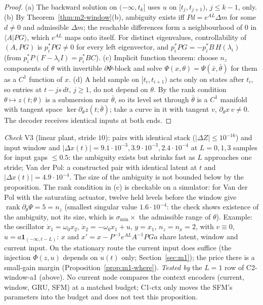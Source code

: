 \begin{proof}
(a) The backward solution on $(-\infty,t_k]$ uses $u$ on $[t_j,t_{j+1})$, $j\le k-1$, only.
(b) By Theorem~\ref{thm:m2-window}(b), ambiguity exists iff $P d=e^{AL}\Delta m$ for some $d\ne0$ and admissible
$\Delta m$; the reachable differences form a neighbourhood of $0$ in $\langle A|PG\rangle$, which $e^{AL}$ maps onto
itself. For distinct eigenvalues, controllability of $(A,PG)$ is $p_i^*PG\ne0$ for every left eigenvector,
and $p_i^*PG=-p_i^*B\,H(\lambda_i)$ (from $p_i^*P(F-\lambda_iI)=p_i^*BC$).
(c) Implicit function theorem: choose $n_z$ components of $\theta$ with invertible $\partial\Psi$-block and solve
$\Psi(x,\theta)=\Psi(\bar x,\bar\theta)$ for them as a $C^1$ function of $x$.
(d) A held sample on $[t_i,t_{i+1})$ acts only on states after $t_i$, so entries at $t-js\,dt$, $j\ge1$, do not depend on
$\theta$. By the rank condition $\theta\mapsto z(t;\theta)$ is a submersion near $\bar\theta$, so its level set through
$\bar\theta$ is a $C^1$ manifold with tangent space $\ker\partial_\theta z(t;\bar\theta)$; take a curve in it with tangent $v$,
$\partial_\theta x\,v\ne0$. The decoder receives identical inputs at both ends.
\end{proof}
\noindent\emph{Check} V3 (linear plant, stride $10$): pairs with identical stack ($|\Delta Z|\le10^{-16}$) and input window and
$|\Delta x(t)|=9.1\cdot10^{-3},3.9\cdot10^{-3},2.4\cdot10^{-4}$ at $L=0,1,3$ samples for input gaps $\le0.5$: the ambiguity
exists but shrinks fast as $L$ approaches one stride; Van der Pol: a constructed pair with identical latent at $t$ and
$|\Delta x(t)|=4.9\cdot10^{-4}$. The size of the ambiguity is not bounded below by the proposition.
The rank condition in (c) is checkable on a simulator: for Van der Pol with the saturating actuator,
twelve held levels before the window give $\operatorname{rank}\partial_\theta\Psi=5=n_z$ (smallest singular value
$1.6\cdot10^{-4}$: the check shows existence of the ambiguity, not its size, which is $\sigma_{\min}\times$ the
admissible range of $\theta$). Example: the oscillator $\dot x_1=\omega_0x_2$, $\dot x_2=-\omega_0x_1+u$, $y=x_1$,
$n_z=n_x=2$, with $v\equiv0$, $u=a\mathbf 1_{(-\infty,t-L)}$: $x$ and $x'=x-P^{-1}e^{AL}A^{-1}PGa$ share latent, window
and current input. On the stationary route the current input does suffice (the injection $\Phi(z,u)$ depends on $u(t)$
only; Section~\ref{sec:m1}); the price there is a small-gain margin (Proposition~\ref{prop:m1-where}).
\emph{Tested by} the $L=1$ row of C2-window-a1 (above). No current node compares the context encoders (current, window,
GRU, SFM) at a matched budget; C1-ctx only moves the SFM's parameters into the budget and does not test this
proposition.

